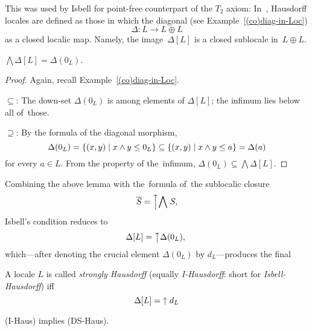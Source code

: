 This was used by Isbell for point-free counterpart of the $T_2$ axiom:
In~\cite{isbell72}, Hausdorff locales are defined as those in which the
diagonal (see Example~\ref{(co)diag-in-Loc})
\[
  \Delta\colon L \to L \oplus L
\]
as a closed localic map.
Namely, the image~$\Delta[L]$ is a closed sublocale in~$L \oplus L$.

\begin{lem}
  $\bigwedge \Delta[L] = \Delta(0_L)$.
\end{lem}

\begin{proof}
  Again, recall Example~\ref{(co)diag-in-Loc}\thinspace.

  $\subseteq$: The down-set $\Delta(0_L)$ is among elements of $\Delta[L]$; the
  infimum lies below all of~those.

  $\supseteq$: By the formula of the diagonal morphism,
  \[
    \Delta(0_L)
    = \left\{(x, y) \mid x \wedge y \leq 0_L \right\}
    \subseteq \left\{(x, y) \mid x \wedge y \leq a \right\}
    = \Delta(a)
  \]
  for every $a\in L$.
  From the property of the~infimum, $\Delta(0_L) \subseteq \bigwedge
  \Delta[L]$.
\end{proof}

Combining the above lemma with the~formula of~the sublocalic closure
\[
  \overline{S} = \left\uparrow \bigwedge \right. S,
\]
Isbell's condition reduces to
\[
  \Delta[L] = \left\uparrow \Delta(0_L),\right.
\]
which---after denoting the crucial element $\Delta(0_L)$ by $d_L$---produces
the final

\begin{framed}
  \begin{df}[I-Haus]
    A locale $L$ is called \emph{strongly Hausdorff\/} (equally
    \emph{I-Hausdorff}: short for \emph{Isbell-Hausdorff}) iff
    \[
      \Delta[L] = \left\uparrow\right. d_L
    \]
  \end{df}
\end{framed}

\begin{thm} \label{IHaus->DSHaus}
  (I-Haus) implies (DS-Haus).
\end{thm}

